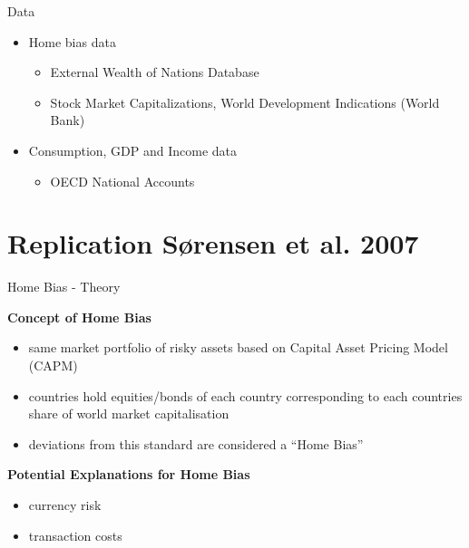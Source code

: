 \documentclass[aspectratio=169, 10pt]{beamer}
\begin{document}
\begin{frame}{Data}

\begin{itemize}
  \item Home bias data
    \begin{itemize}
    \item External Wealth of Nations Database
    \item Stock Market Capitalizations, World Development Indications (World Bank)
    \end{itemize} 
\end{itemize}

\begin{itemize}
  \item Consumption, GDP and Income data
    \begin{itemize}
    \item OECD National Accounts 
    \end{itemize} 
  \end{itemize} 

\end{frame}

\section{Replication Sørensen et al. 2007}

\begin{frame}{Home Bias - Theory}

\textbf{Concept of Home Bias}
\begin{itemize}
    \item same market portfolio of risky assets based on Capital Asset Pricing Model (CAPM)
    \item countries hold equities/bonds of each country corresponding to each countries share of world market capitalisation
    \item deviations from this standard are considered a ``Home Bias''
\end{itemize}

\vspace{0.3cm}

\textbf{Potential Explanations for Home Bias}
\begin{itemize}
    \item currency risk
    \item transaction costs
\end{itemize}

\end{frame}
\end{document}
